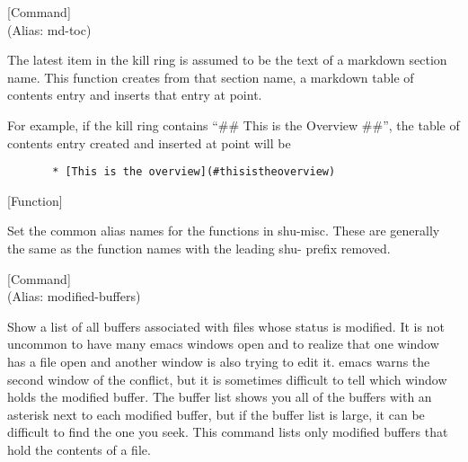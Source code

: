 \vspace{1em}
\noindent
{}
\usebox{\funcname}
 \hfill [Command]\\%
 (Alias: md-toc)

\begin{doc-string}
The latest item in the kill ring is assumed to be the text of a markdown
section name.  This function creates from that section name, a markdown table of
contents entry and inserts that entry at point.

For example, if the kill ring contains ``\#\# This is the Overview \#\#'', the table
of contents entry created and inserted at point will be

\small{\begin{verbatim}
       * [This is the overview](#thisistheoverview)
\end{verbatim}}
\end{doc-string}

\vspace{1em}
\noindent
{}
\usebox{\funcname}
 \hfill [Function]

\begin{doc-string}
Set the common alias names for the functions in shu-misc.
These are generally the same as the function names with the leading
shu- prefix removed.
\end{doc-string}

\vspace{1em}
\noindent
{}
\usebox{\funcname}
 \hfill [Command]\\%
 (Alias: modified-buffers)

\begin{doc-string}
Show a list of all buffers associated with files whose status is modified.
It is not uncommon to have many emacs windows open and to realize that one
window has a file open and another window is also trying to edit it.  emacs
warns the second window of the conflict, but it is sometimes difficult to tell
which window holds the modified buffer.  The buffer list shows you all of the
buffers with an asterisk next to each modified buffer, but if the buffer list
is large, it can be difficult to find the one you seek.  This command lists
only modified buffers that hold the contents of a file.
\end{doc-string}

